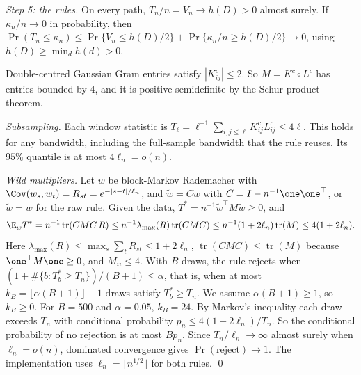 \emph{Step 5: the rules.} On every path, $T_n/n=V_n\to h(D)>0$ almost surely. If $\kappa_n/n\to0$ in probability, then $\Pr(T_n\le\kappa_n)\le\Pr\{V_n\le h(D)/2\}+\Pr\{\kappa_n/n\geq h(D)/2\}\to0$, using $h(D)\ge\min_dh(d)>0$.

Double-centred Gaussian Gram entries satisfy $|K^c_{ij}|\le2$. So $M=K^c\circ L^c$ has entries bounded by $4$, and it is positive semidefinite by the Schur product theorem.

\emph{Subsampling.} Each window statistic is $T_\ell=\ell^{-1}\sum_{i,j\le\ell}K^c_{ij}L^c_{ij}\le4\ell$. This holds for any bandwidth, including the full-sample bandwidth that the rule reuses. Its $95\%$ quantile is at most $4\ell_n=o(n)$.

\emph{Wild multipliers.} Let $w$ be block-Markov Rademacher with $\Cov(w_s,w_t)=R_{st}=e^{-|s-t|/\ell_n}$, and $\tilde w=Cw$ with $C=I-n^{-1}\one\one^\top$, or $\tilde w=w$ for the raw rule. Given the data, $T^*=n^{-1}\tilde w^\top M\tilde w\ge0$, and
\[
\E_wT^*=n^{-1}\operatorname{tr}(CMC\,R)\le n^{-1}\lambda_{\max}(R)\operatorname{tr}(CMC)\le n^{-1}(1+2\ell_n)\operatorname{tr}(M)\le4(1+2\ell_n).
\]
Here $\lambda_{\max}(R)\le\max_s\sum_tR_{st}\le1+2\ell_n$, $\operatorname{tr}(CMC)\le\operatorname{tr}(M)$ because $\one^\top M\one\ge0$, and $M_{ii}\le4$. With $B$ draws, the rule rejects when $(1+\#\{b:T^*_b\ge T_n\})/(B+1)\le\alpha$, that is, when at most $k_B=\lfloor\alpha(B+1)\rfloor-1$ draws satisfy $T^*_b\ge T_n$. We assume $\alpha(B+1)\ge1$, so $k_B\ge0$. For $B=500$ and $\alpha=0.05$, $k_B=24$. By Markov's inequality each draw exceeds $T_n$ with conditional probability $p_n\le4(1+2\ell_n)/T_n$. So the conditional probability of no rejection is at most $Bp_n$. Since $T_n/\ell_n\to\infty$ almost surely when $\ell_n=o(n)$, dominated convergence gives $\Pr(\text{reject})\to1$. The implementation uses $\ell_n=\lfloor n^{1/2}\rfloor$ for both rules. \qed

